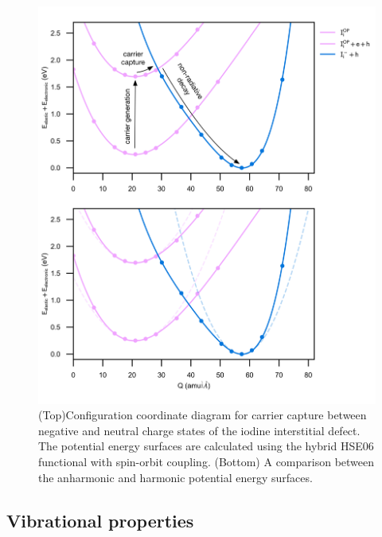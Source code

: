\begin{figure}[h!]   
\centering
  \includegraphics[width=1.0\columnwidth]{figures/ch6/carrier_capture_digram.png}
  \caption[Configuration coordinate diagram for carrier capture between negative and neutral charge states of the iodine interstitial defect]{(Top)Configuration coordinate diagram for carrier capture between negative and neutral charge states of the iodine interstitial defect. The potential energy surfaces are calculated using the hybrid HSE06 functional with spin-orbit coupling. (Bottom) A comparison between the anharmonic and harmonic potential energy surfaces. }
\label{configuration_coordinate}
\end{figure}


\subsection{Vibrational properties}

